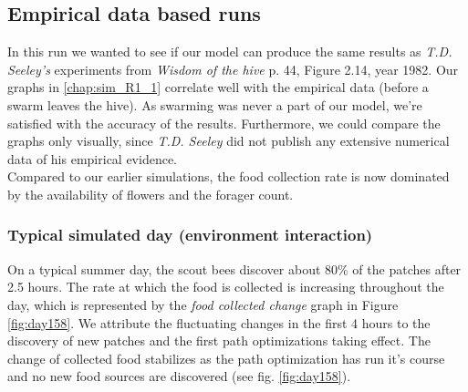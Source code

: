 \subsection{Empirical data based runs}
	In this run we wanted to see if our model can produce the same results as \textit{T.D. Seeley's} experiments from \textit{Wisdom of the hive} p. 44, Figure  2.14, year 1982. Our graphs in \ref{chap:sim_R1_1} correlate well with the empirical data (before a swarm leaves the hive). As swarming was never a part of our model, we're satisfied with the accuracy of the results. Furthermore, we could compare the graphs only visually, since \textit{T.D. Seeley} did not publish any  extensive numerical data of his empirical evidence.\\
	Compared to our earlier simulations, the food collection rate is now dominated by the availability of flowers and the forager count.
	
	\subsubsection{Typical simulated day (environment interaction)}
		On a typical summer day, the scout bees discover about $80\%$ of the patches after 2.5 hours. The rate at which the food is collected is increasing throughout the day, which is represented by the \textit{food collected change} graph in Figure \ref{fig:day158}. We attribute the fluctuating changes in the first 4 hours to the discovery of new patches and the first path optimizations taking effect. The change of collected food stabilizes as the path optimization has run it's course and no new food sources are discovered (see fig. \ref{fig:day158}).\\
		
